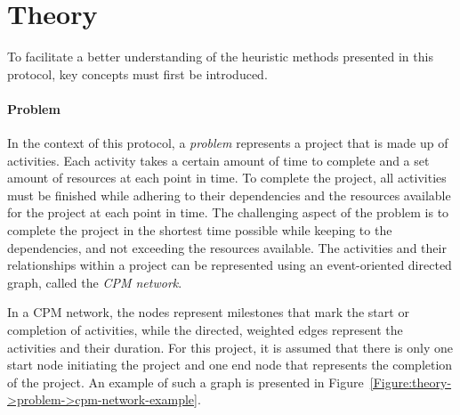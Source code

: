 \section{Theory}
To facilitate a better understanding of the heuristic methods presented in this protocol, key concepts must first be introduced.

\paragraph{Problem}
In the context of this protocol, a \textit{problem} represents a project that is made up of activities.
Each activity takes a certain amount of time to complete and a set amount of resources at each point in time.
To complete the project, all activities must be finished while adhering to their dependencies and the resources available for the project at each point in time.
The challenging aspect of the problem is to complete the project in the shortest time possible while keeping to the dependencies, and not exceeding the resources available. The activities and their relationships within a project can be represented using an event-oriented directed graph, called the \textit{CPM network}.

In a CPM network, the nodes represent milestones that mark the start or completion of activities, while the directed, weighted edges represent the activities and their duration.
For this project, it is assumed that there is only one start node initiating the project and one end node that represents the completion of the project.
An example of such a graph is presented in Figure~\ref{Figure:theory->problem->cpm-network-example}.

